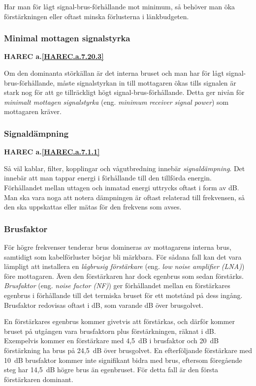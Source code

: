 Har man för lågt signal-brus-förhållande mot minimum, så behöver man öka
förstärkningen eller oftast minska förlusterna i länkbudgeten.

\subsubsection{Minimal mottagen signalstyrka}
\textbf{HAREC a.\ref{HAREC.a.7.20.3}\label{myHAREC.a.7.20.3}}

Om den dominanta störkällan är det interna bruset och man har för lågt
signal-brus-förhållande, måste signalstyrkan in till mottagaren ökas
tills signalen är stark nog för att ge tillräckligt högt
signal-brus-förhållande.
Detta ger nivån för \emph{minimalt mottagen signalstyrka} (eng.
\emph{minimum receiver signal power}) som mottagaren kräver.

\subsubsection{Signaldämpning}
\textbf{HAREC a.\ref{HAREC.a.7.1.1}\label{myHAREC.a.7.1.1}}

Så väl kablar, filter, kopplingar och vågutbredning innebär
\emph{signaldämpning}.
Det innebär att man tappar energi i förhållande till den tillförda energin.
Förhållandet mellan uttagen och inmatad energi uttrycks oftast i form av dB.
Man ska vara noga att notera dämpningen är oftast relaterad till frekvensen,
så den ska uppskattas eller mätas för den frekvens som avses.

\subsubsection{Brusfaktor}
\label{brusfaktor}

För högre frekvenser tenderar brus domineras av mottagarens interna brus,
samtidigt som kabelförluster börjar bli märkbara.
För sådana fall kan det vara lämpligt att installera en
\emph{lågbrusig förstärkare} (eng. \emph{low noise amplifier (LNA)}) före
mottagaren.
Även den förstärkaren har dock egenbrus som sedan förstärks.
\emph{Brusfaktor} (eng. \emph{noise factor (NF)}) ger förhållandet mellan en
förstärkares egenbrus i förhållande till det termiska bruset för ett motstånd
på dess ingång.
Brusfaktor redovisas oftast i dB, som varande dB över brusgolvet.

En förstärkares egenbrus kommer givetvis att förstärkas, och därför kommer
bruset på utgången vara brusfaktorn plus förstärkningen, räknat i dB.
Exempelvis kommer en förstärkare med 4,5~dB i brusfaktor och 20~dB förstärkning
ha brus på 24,5~dB över brusgolvet.
En efterföljande förstärkare med 10~dB brusfaktor kommer inte signifikant
bidra med brus, eftersom föregående steg har 14,5~dB högre brus än egenbruset.
För detta fall är den första förstärkaren dominant.

